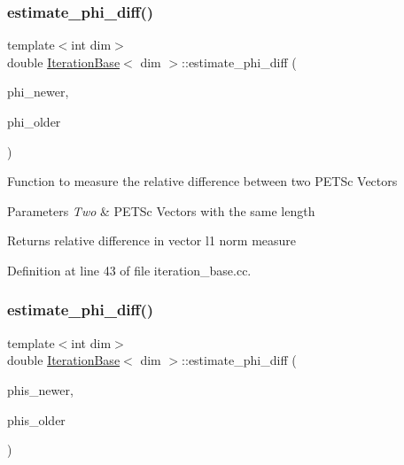 \subsubsection{\texorpdfstring{estimate\+\_\+phi\+\_\+diff()}{estimate\_phi\_diff()}\hspace{0.1cm}{\footnotesize\ttfamily [2/4]}}
{\footnotesize\ttfamily template$<$int dim$>$ \\
double \hyperlink{class_iteration_base}{Iteration\+Base}$<$ dim $>$\+::estimate\+\_\+phi\+\_\+diff (\begin{DoxyParamCaption}\item[{P\+E\+T\+Sc\+Wrappers\+::\+M\+P\+I\+::\+Vector $\ast$}]{phi\+\_\+newer,  }\item[{P\+E\+T\+Sc\+Wrappers\+::\+M\+P\+I\+::\+Vector $\ast$}]{phi\+\_\+older }\end{DoxyParamCaption})\hspace{0.3cm}{\ttfamily [protected]}}

Function to measure the relative difference between two P\+E\+T\+Sc Vectors


\begin{DoxyParams}{Parameters}
{\em Two} & P\+E\+T\+Sc Vectors with the same length \\
\hline
\end{DoxyParams}
\begin{DoxyReturn}{Returns}
relative difference in vector l1 norm measure 
\end{DoxyReturn}


Definition at line 43 of file iteration\+\_\+base.\+cc.

\mbox{\label{class_iteration_base_aa929c0e69fd2566db98611b810354123}} 
\subsubsection{\texorpdfstring{estimate\+\_\+phi\+\_\+diff()}{estimate\_phi\_diff()}\hspace{0.1cm}{\footnotesize\ttfamily [3/4]}}
{\footnotesize\ttfamily template$<$int dim$>$ \\
double \hyperlink{class_iteration_base}{Iteration\+Base}$<$ dim $>$\+::estimate\+\_\+phi\+\_\+diff (\begin{DoxyParamCaption}\item[{std\+::vector$<$ Vector$<$ double $>$ $>$ \&}]{phis\+\_\+newer,  }\item[{std\+::vector$<$ Vector$<$ double $>$ $>$ \&}]{phis\+\_\+older }\end{DoxyParamCaption})\hspace{0.3cm}{\ttfamily [protected]}}

